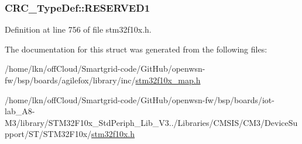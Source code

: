 \subsubsection[{\texorpdfstring{R\+E\+S\+E\+R\+V\+E\+D1}{RESERVED1}}]{ C\+R\+C\+\_\+\+Type\+Def\+::\+R\+E\+S\+E\+R\+V\+E\+D1}\hypertarget{struct_c_r_c___type_def_a8b205c6e25b1808ac016db2356b3021d}{}\label{struct_c_r_c___type_def_a8b205c6e25b1808ac016db2356b3021d}


Definition at line 756 of file stm32f10x.\+h.



The documentation for this struct was generated from the following files\+:\begin{DoxyCompactItemize}
\item 
/home/lkn/off\+Cloud/\+Smartgrid-\/code/\+Git\+Hub/openwsn-\/fw/bsp/boards/agilefox/library/inc/\hyperlink{agilefox_2library_2inc_2stm32f10x__map_8h}{stm32f10x\+\_\+map.\+h}\item 
/home/lkn/off\+Cloud/\+Smartgrid-\/code/\+Git\+Hub/openwsn-\/fw/bsp/boards/iot-\/lab\+\_\+\+A8-\/\+M3/library/\+S\+T\+M32\+F10x\+\_\+\+Std\+Periph\+\_\+\+Lib\+\_\+\+V3../\+Libraries/\+C\+M\+S\+I\+S/\+C\+M3/\+Device\+Support/\+S\+T/\+S\+T\+M32\+F10x/\hyperlink{iot-lab___a8-_m3_2library_2_s_t_m32_f10x___std_periph___lib___v3_85_80_2_libraries_2_c_m_s_i_s_26497265545392eb5694b064ae15018db}{stm32f10x.\+h}\end{DoxyCompactItemize}
